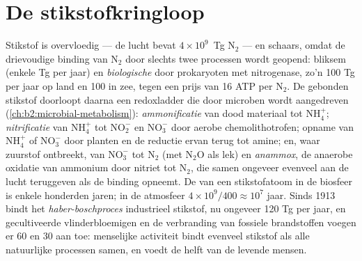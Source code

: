 \section{De stikstofkringloop}

\begin{proposition}[De stikstofkringloop]\label{prop:b2:biogeochemical-cycles:nitrogen}
Stikstof is overvloedig --- de lucht bevat $4\times 10^{9}$~Tg
$\mathrm{N_2}$ --- en schaars, omdat de drievoudige binding van $\mathrm{N_2}$ door
slechts twee processen wordt geopend: bliksem (enkele Tg per jaar) en
\emph{biologische } door prokaryoten met
nitrogenase, zo'n 100 Tg per jaar op land en 100 in zee, tegen een
prijs van 16 ATP per $\mathrm{N_2}$. De gebonden stikstof doorloopt daarna een
redoxladder die door microben wordt aangedreven (\cref{ch:b2:microbial-metabolism}):
\emph{ammonificatie} van dood materiaal tot $\mathrm{NH_4^{+}}$;
\emph{nitrificatie} van $\mathrm{NH_4^{+}}$ tot $\mathrm{NO_2^{-}}$ en $\mathrm{NO_3^{-}}$ door
aerobe chemolithotrofen; opname van $\mathrm{NH_4^{+}}$ of $\mathrm{NO_3^{-}}$ door planten
en de reductie ervan terug tot amine; en, waar zuurstof ontbreekt,
\emph{} van $\mathrm{NO_3^{-}}$ tot $\mathrm{N_2}$ (met $\mathrm{N_2O}$ als
lek) en \emph{anammox}, de anaerobe oxidatie van ammonium door
nitriet tot $\mathrm{N_2}$, die samen ongeveer evenveel aan de lucht teruggeven
als de binding opneemt. De  van een stikstofatoom in de
biosfeer is enkele honderden jaren; in de atmosfeer $4\times
10^{9}/400 \approx 10^{7}$ jaar. Sinds 1913 bindt het \emph{haber-boschproces}
industrieel stikstof, nu ongeveer 120 Tg per jaar,
en gecultiveerde vlinderbloemigen en de verbranding van fossiele brandstoffen
voegen er 60 en 30 aan toe: menselijke activiteit bindt evenveel stikstof als
alle natuurlijke processen samen, en voedt de helft van de levende mensen.
\end{proposition}

